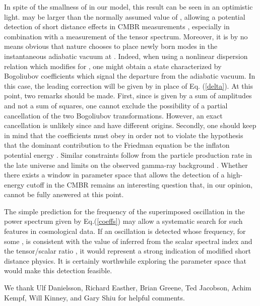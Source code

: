 \documentclass[a4paper,aps,prd,preprint,groupedaddress,nofootinbib]{revtex4}
\begin{document}
In spite of the smallness of \myHighlight{$\delta$}\coordHE{} in our model, this
result can be seen in an optimistic light. \myHighlight{$\sigma$}\coordHE{} may be larger than
the   normally assumed value of \coordHE{}, allowing a potential
detection of short distance effects in CMBR measurements
\cite{Eea01b,Kea02}, especially in combination with a measurement of
the tensor spectrum. Moreover, it is by no means obvious that nature
chooses to place newly born modes in the instantaneous adiabatic
vacuum at \coordHE{}.  Indeed, when using a nonlinear dispersion
relation which modifies \coordHE{} for \coordHE{}, one might
obtain a state characterized by Bogoliubov coefficients \coordHE{} which signal the departure from the adiabatic vacuum. In this
case, the leading correction will be given by \coordHE{} in place of
Eq. (\ref{delta}). At this point, two remarks should be made.  First,
since \coordHE{} is given by a sum of amplitudes and not
a sum of squares, one cannot exclude the possibility of a partial
cancellation of the two Bogoliubov transformations. However, an exact
cancellation is unlikely since \coordHE{} and 
\coordHE{} have different origins.  Secondly, one should keep
in mind that the coefficients \coordHE{}  must obey \coordHE{}  in order not to  violate the
hypothesis that the dominant contribution  to the Friedman equation be
the inflaton potential energy \cite{T00,NP01,S01}. Similar constraints
follow from the particle production rate in the late universe and
limits on the observed gamma-ray background \cite{ST02}. Whether there
exists a window in parameter space that allows the detection of a
high-energy cutoff in the CMBR remains an interesting question that,
in our opinion, cannot be fully answered at this point.

The simple prediction for the frequency of the superimposed
oscillation in the power spectrum given by Eq.(\ref{coeffs}) may allow
a systematic search for such features in cosmological data. If an
oscillation is detected whose frequency, for some \myHighlight{$\sigma$}\coordHE{}, is
consistent with the value of \myHighlight{$\epsilon$}\coordHE{} inferred from the scalar
spectral index and the tensor/scalar ratio \cite{K98b}, it would
represent a strong indication of modified 
short distance physics. It is certainly worthwhile exploring the
parameter space that would make this detection feasible.

\begin{acknowledgments}
We thank Ulf Danielsson, Richard Easther, Brian Greene, Ted Jacobson,
Achim Kempf, Will Kinney, and Gary Shiu for helpful comments.
\end{acknowledgments}


\end{document}
